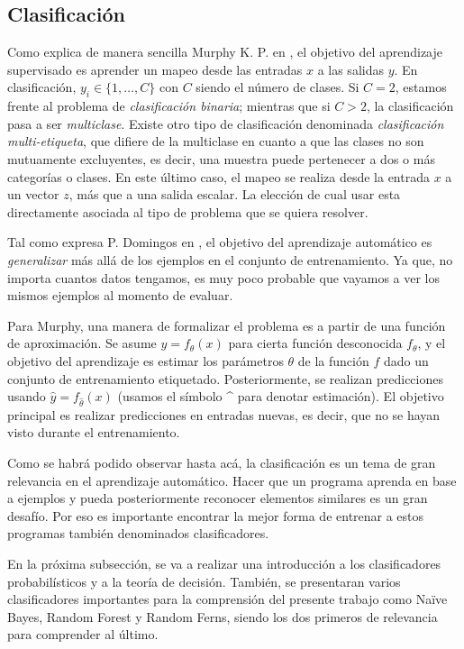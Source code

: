 \subsection{Clasificación}

		Como explica de manera sencilla Murphy K. P. en \cite{Murphy12}, el objetivo del aprendizaje supervisado es aprender un mapeo desde las entradas $x$ a las salidas $y$. En clasificación, $y_i \in \{1,\dots,C\}$ con $C$ siendo el número de clases. Si $C=2$, estamos frente al problema de \textit{clasificación binaria}; mientras que si $C>2$, la clasificación pasa a ser \textit{multiclase}. Existe otro tipo de clasificación denominada \textit{clasificación multi-etiqueta}, que difiere de la multiclase en cuanto a que las clases no son mutuamente excluyentes, es decir, una muestra puede pertenecer a dos o más categorías o clases. En este último caso, el mapeo se realiza desde la entrada $x$ a un vector $z$, más que a una salida escalar. La elección de cual usar esta directamente asociada al tipo de problema que se quiera resolver.
		
		Tal como expresa P. Domingos en \cite{PDomingo}, el objetivo del aprendizaje automático es \textit{generalizar} más allá de los ejemplos en el conjunto de entrenamiento. Ya que, no importa cuantos datos tengamos, es muy poco pro\-ba\-ble que vayamos a ver los mismos ejemplos al momento de evaluar.
		
		Para Murphy, una manera de formalizar el problema es a partir de una función de aproximación. Se asume $y = f_{\theta}(x)$ para cierta función des\-co\-no\-ci\-da $f_{\theta}$, y el objetivo del aprendizaje es estimar los parámetros $\theta$ de la función $f$ dado un conjunto de entrenamiento etiquetado. Posteriormente, se realizan predicciones usando $\hat{y} = f_{\hat{\theta}}(x)$ (usamos el símbolo \string^ para denotar estimación). El objetivo principal es realizar predicciones en entradas nuevas, es decir, que no se hayan visto durante el entrenamiento.
		
		Como se habrá podido observar hasta acá, la clasificación es un tema de gran relevancia en el aprendizaje automático. Hacer que un programa aprenda en base a ejemplos y pueda posteriormente reconocer elementos similares es un gran desafío. Por eso es importante encontrar la mejor forma de entrenar a estos programas también denominados clasificadores.
		
		En la próxima subsección, se va a realizar una introducción a los clasificadores probabilísticos y a la teoría de decisión. También, se presentaran varios clasificadores importantes para la comprensión del presente trabajo como Na\"{i}ve Bayes, Random Forest y Random Ferns, siendo los dos primeros de relevancia para comprender al último.
		
